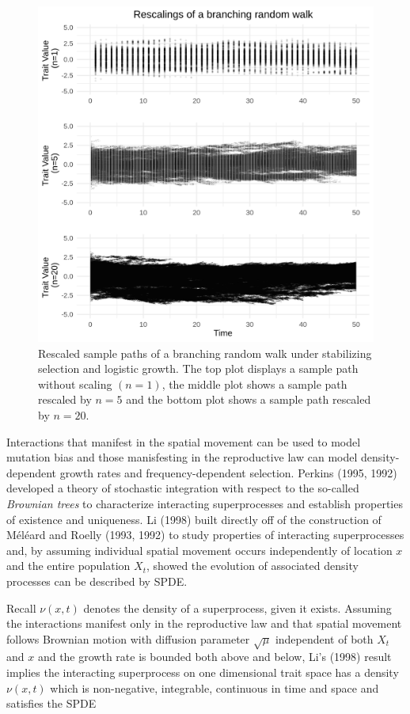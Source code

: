 \documentclass[]{elsarticle} %
\begin{document}
\begin{figure}

{\centering \includegraphics[width=0.8\linewidth]{rescaled_plots} 

}

\caption{\label{rescaled}Rescaled sample paths of a branching random walk under stabilizing selection and logistic growth. The top plot displays a sample path without scaling $(n=1)$, the middle plot shows a sample path rescaled by $n=5$ and the bottom plot shows a sample path rescaled by $n=20$.}\label{fig:unnamed-chunk-4}
\end{figure}

Interactions that manifest in the spatial movement can be used to model
mutation bias and those manisfesting in the reproductive law can model
density-dependent growth rates and frequency-dependent selection.
Perkins (1995, 1992) developed a theory of stochastic integration with
respect to the so-called \emph{Brownian trees} to characterize
interacting superprocesses and establish properties of existence and
uniqueness. Li (1998) built directly off of the construction of Méléard
and Roelly (1993, 1992) to study properties of interacting
superprocesses and, by assuming individual spatial movement occurs
independently of location \(x\) and the entire population \(X_t\),
showed the evolution of associated density processes can be described by
SPDE.

Recall \(\nu(x,t)\) denotes the density of a superprocess, given it
exists. Assuming the interactions manifest only in the reproductive law
and that spatial movement follows Brownian motion with diffusion
parameter \(\sqrt\mu\) independent of both \(X_t\) and \(x\) and the
growth rate is bounded both above and below, Li's (1998) result implies
the interacting superprocess on one dimensional trait space has a
density \(\nu(x,t)\) which is non-negative, integrable, continuous in
time and space and satisfies the SPDE
\end{document}
